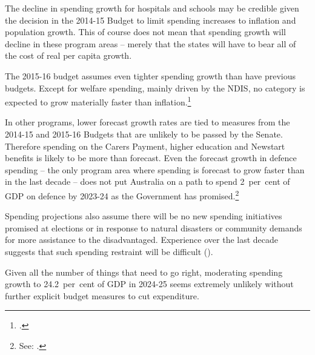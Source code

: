 \documentclass[continuous]{grattan}
\begin{document}
The decline in spending growth for hospitals and schools may be credible given the decision in the 2014-15 Budget to limit spending increases to inflation and population growth. This of course does not mean that spending growth will decline in these program areas – merely that the states will have to bear all of the cost of real per capita growth.

The 2015-16 budget assumes even tighter spending growth than have previous budgets. Except for welfare spending, mainly driven by the NDIS, no category is expected to grow materially faster than inflation.\footcite[][BP No.~1, pp.--11]{Treasury2015BudgetPapers201516}  

In other programs, lower forecast growth rates are tied to measures from the 2014-15 and 2015-16 Budgets that are unlikely to be passed by the Senate. Therefore spending on the Carers Payment, higher education and Newstart benefits is likely to be more than forecast. Even the forecast growth in defence spending – the only program area where spending is forecast to grow faster than in the last decade – does not put Australia on a path to spend 2~per~cent of GDP on defence by 2023-24 as the Government has promised.\footnote{See: \textcite[][1]{Defence2014}.} 


Spending projections also assume there will be no new spending initiatives promised at elections or in response to natural disasters or community demands for more assistance to the disadvantaged. Experience over the last decade suggests that such spending restraint will be difficult ().

Given all the number of things that need to go right, moderating spending growth to 24.2~per~cent of GDP in 2024-25 seems extremely unlikely without further explicit budget measures to cut expenditure.
\end{document}
